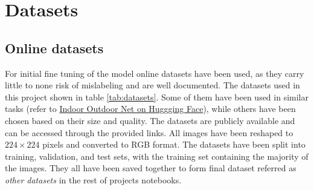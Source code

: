 \documentclass[a4paper]{article}
\begin{document}
\section{Datasets}
\label{sec:datasets}

\subsection{Online datasets}

For initial fine tuning of the model online datasets have been used, as they carry little to none risk of mislabeling and are well documented. The datasets used in this project shown in table \ref{tab:datasets}. Some of them have been used in similar tasks (refer to \href{https://huggingface.co/prithivMLmods/IndoorOutdoorNet}{Indoor Outdoor Net on Huggging Face}), while others have been chosen based on their size and quality. The datasets are publicly available and can be accessed through the provided links. All images have been reshaped to $224 \times 224$ pixels and converted to RGB format. The datasets have been split into training, validation, and test sets, with the training set containing the majority of the images. They all have been saved together to form final dataset referred as \textit{other datasets} in the rest of projects notebooks.
\end{document}
